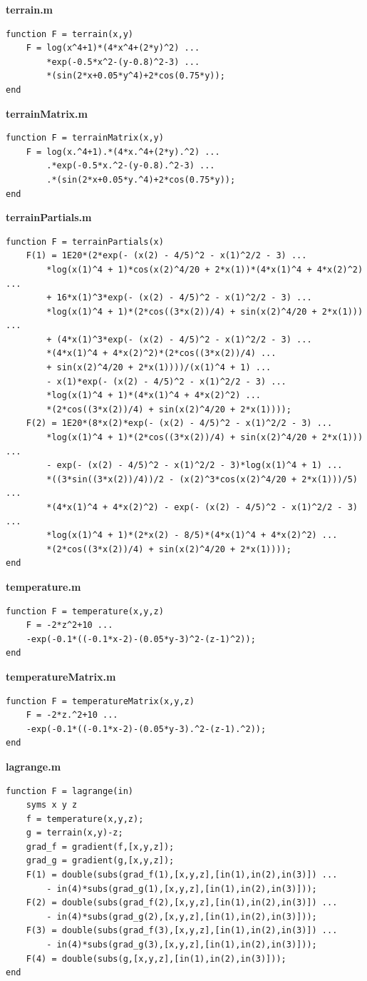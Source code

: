 \documentclass[12pt,onecolumn]{article}
\begin{document}
\newpage
\textbf{terrain.m}
\begin{lstlisting}
function F = terrain(x,y)
    F = log(x^4+1)*(4*x^4+(2*y)^2) ...
        *exp(-0.5*x^2-(y-0.8)^2-3) ...
        *(sin(2*x+0.05*y^4)+2*cos(0.75*y));
end
\end{lstlisting}

\textbf{terrainMatrix.m}
\begin{lstlisting}
function F = terrainMatrix(x,y)
    F = log(x.^4+1).*(4*x.^4+(2*y).^2) ...
        .*exp(-0.5*x.^2-(y-0.8).^2-3) ...
        .*(sin(2*x+0.05*y.^4)+2*cos(0.75*y));
end
\end{lstlisting}

\textbf{terrainPartials.m}
\begin{lstlisting}
function F = terrainPartials(x)
    F(1) = 1E20*(2*exp(- (x(2) - 4/5)^2 - x(1)^2/2 - 3) ...
        *log(x(1)^4 + 1)*cos(x(2)^4/20 + 2*x(1))*(4*x(1)^4 + 4*x(2)^2) ...
        + 16*x(1)^3*exp(- (x(2) - 4/5)^2 - x(1)^2/2 - 3) ...
        *log(x(1)^4 + 1)*(2*cos((3*x(2))/4) + sin(x(2)^4/20 + 2*x(1))) ...
        + (4*x(1)^3*exp(- (x(2) - 4/5)^2 - x(1)^2/2 - 3) ...
        *(4*x(1)^4 + 4*x(2)^2)*(2*cos((3*x(2))/4) ...
        + sin(x(2)^4/20 + 2*x(1))))/(x(1)^4 + 1) ...
        - x(1)*exp(- (x(2) - 4/5)^2 - x(1)^2/2 - 3) ...
        *log(x(1)^4 + 1)*(4*x(1)^4 + 4*x(2)^2) ...
        *(2*cos((3*x(2))/4) + sin(x(2)^4/20 + 2*x(1))));
    F(2) = 1E20*(8*x(2)*exp(- (x(2) - 4/5)^2 - x(1)^2/2 - 3) ...
        *log(x(1)^4 + 1)*(2*cos((3*x(2))/4) + sin(x(2)^4/20 + 2*x(1))) ...
        - exp(- (x(2) - 4/5)^2 - x(1)^2/2 - 3)*log(x(1)^4 + 1) ...
        *((3*sin((3*x(2))/4))/2 - (x(2)^3*cos(x(2)^4/20 + 2*x(1)))/5) ...
        *(4*x(1)^4 + 4*x(2)^2) - exp(- (x(2) - 4/5)^2 - x(1)^2/2 - 3) ...
        *log(x(1)^4 + 1)*(2*x(2) - 8/5)*(4*x(1)^4 + 4*x(2)^2) ...
        *(2*cos((3*x(2))/4) + sin(x(2)^4/20 + 2*x(1))));
end
\end{lstlisting}

\textbf{temperature.m}
\begin{lstlisting}
function F = temperature(x,y,z)
    F = -2*z^2+10 ...
    -exp(-0.1*((-0.1*x-2)-(0.05*y-3)^2-(z-1)^2));
end
\end{lstlisting}

\newpage
\textbf{temperatureMatrix.m}
\begin{lstlisting}
function F = temperatureMatrix(x,y,z)
    F = -2*z.^2+10 ...
    -exp(-0.1*((-0.1*x-2)-(0.05*y-3).^2-(z-1).^2));
end
\end{lstlisting}

\textbf{lagrange.m}
\begin{lstlisting}
function F = lagrange(in)
    syms x y z
    f = temperature(x,y,z);
    g = terrain(x,y)-z;
    grad_f = gradient(f,[x,y,z]);
    grad_g = gradient(g,[x,y,z]);
    F(1) = double(subs(grad_f(1),[x,y,z],[in(1),in(2),in(3)]) ...
        - in(4)*subs(grad_g(1),[x,y,z],[in(1),in(2),in(3)]));
    F(2) = double(subs(grad_f(2),[x,y,z],[in(1),in(2),in(3)]) ...
        - in(4)*subs(grad_g(2),[x,y,z],[in(1),in(2),in(3)]));
    F(3) = double(subs(grad_f(3),[x,y,z],[in(1),in(2),in(3)]) ...
        - in(4)*subs(grad_g(3),[x,y,z],[in(1),in(2),in(3)]));
    F(4) = double(subs(g,[x,y,z],[in(1),in(2),in(3)]));
end
\end{lstlisting}
\end{document}
